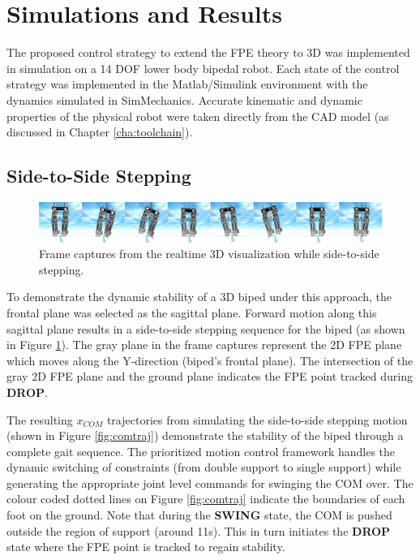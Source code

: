 \section{Simulations and Results} %
\label{sec:simulations_and_results}

The proposed control strategy to extend the FPE theory to 3D was implemented in simulation on a 14 DOF lower body bipedal robot. Each state of the control strategy was implemented in the Matlab/Simulink environment with the dynamics simulated in SimMechanics. Accurate kinematic and dynamic properties of the physical robot were taken directly from the CAD model (as discussed in Chapter \ref{cha:toolchain}).

\subsection{Side-to-Side Stepping} %
\label{sub:3d_simulations}

\begin{figure}[!b]
	\centering
    \includegraphics[scale=0.10]{fig/simulations/sequence.png}
  	\caption{Frame captures from the realtime 3D visualization while side-to-side stepping.}
	\label{fig:sequence}
\end{figure}

To demonstrate the dynamic stability of a 3D biped under this approach, the frontal plane was selected as the sagittal plane. Forward motion along this sagittal plane results in a side-to-side stepping sequence for the biped (as shown in Figure \ref{fig:sequence}). The gray plane in the frame captures represent the 2D FPE plane which moves along the Y-direction (biped's frontal plane). The intersection of the gray 2D FPE plane and the ground plane indicates the FPE point tracked during \textbf{DROP}. 

The resulting $x_{COM}$ trajectories from simulating the side-to-side stepping motion (shown in Figure \ref{fig:comtraj}) demonstrate the stability of the biped through a complete gait sequence. The prioritized motion control framework handles the dynamic switching of constraints (from double support to single support) while generating the appropriate joint level commands for swinging the COM over. The colour coded dotted lines on Figure \ref{fig:comtraj} indicate the boundaries of each foot on the ground. Note that during the \textbf{SWING} state, the COM is pushed outside the region of support (around 11s). This in turn initiates the \textbf{DROP} state where the FPE point is tracked to regain stability.

